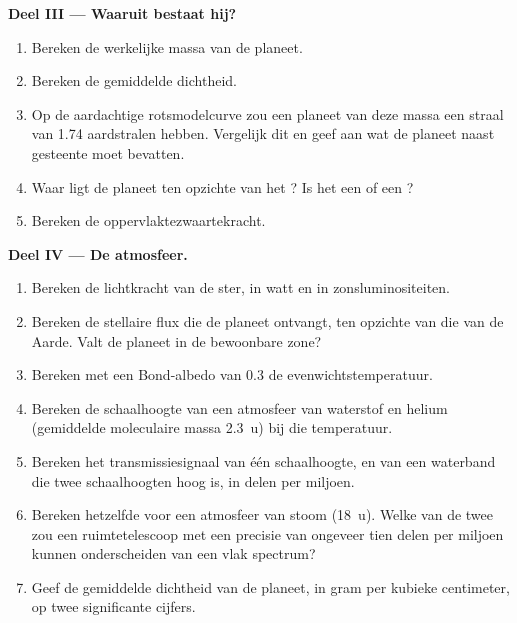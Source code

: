 \begin{problem}
\medskip\noindent\textbf{Deel III --- Waaruit bestaat hij?}
\begin{enumerate}[resume]
\item Bereken de werkelijke massa van de planeet.
\item Bereken de gemiddelde dichtheid.
\item Op de aardachtige rotsmodelcurve zou een planeet van deze massa
  een straal van 1.74 aardstralen hebben. Vergelijk dit en geef aan wat de planeet
  naast gesteente moet bevatten.
\item Waar ligt de planeet ten opzichte van het ? Is het
  een  of een ?
\item Bereken de oppervlaktezwaartekracht.
\end{enumerate}

\medskip\noindent\textbf{Deel IV --- De atmosfeer.}
\begin{enumerate}[resume]
\item Bereken de lichtkracht van de ster, in watt en in
  zonsluminositeiten.
\item Bereken de stellaire flux die de planeet ontvangt, ten opzichte van die van de
  Aarde. Valt de planeet in de bewoonbare zone?
\item Bereken met een Bond-albedo van 0.3 de evenwichtstemperatuur.
\item Bereken de schaalhoogte van een atmosfeer van waterstof en helium
  (gemiddelde moleculaire massa \qty{2.3}{u}) bij die temperatuur.
\item Bereken het transmissiesignaal van één schaalhoogte, en van een
  waterband die twee schaalhoogten hoog is, in delen per miljoen.
\item Bereken hetzelfde voor een atmosfeer van stoom (\qty{18}{u}). Welke van
  de twee zou een ruimtetelescoop met een precisie van ongeveer tien delen per
  miljoen kunnen onderscheiden van een vlak spectrum?
\item Geef de gemiddelde dichtheid van de planeet, in gram per kubieke centimeter, op
  twee significante cijfers.
\end{enumerate}
\end{problem}
